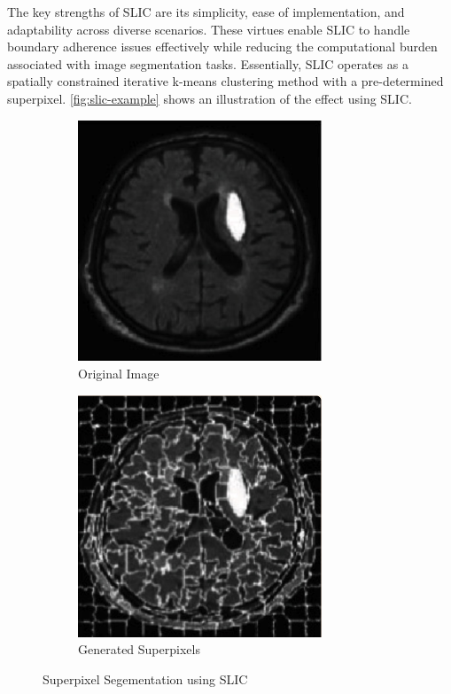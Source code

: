 The key strengths of SLIC are its simplicity, ease of implementation, and adaptability across diverse scenarios. These virtues enable SLIC to handle boundary adherence issues effectively while reducing the computational burden associated with image segmentation tasks. Essentially, SLIC operates as a spatially constrained iterative k-means clustering method with a pre-determined superpixel. \autoref{fig:slic-example} shows an illustration of the effect using SLIC. 

\begin{figure}[htp]
    \centering
    \begin{subfigure}[b]{0.45\textwidth}
        \centering
        \includegraphics[width=0.8\textwidth]{./figures/slic-img.png}
        \caption{Original Image}
        \label{fig:slic-img}
    \end{subfigure}
    \hfill
    \begin{subfigure}[b]{0.45\textwidth}
        \centering
        \includegraphics[width=0.8\textwidth]{./figures/slic-seg.png}
        \caption{Generated Superpixels}
        \label{fig:slic-seg}
    \end{subfigure}
    \caption{Superpixel Segementation using SLIC}
    \label{fig:slic-example}
\end{figure}

